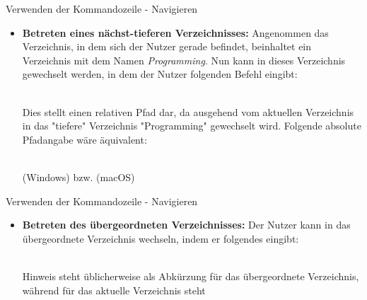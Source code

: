      
     \begin{frame}{Verwenden der Kommandozeile - Navigieren}
        
        \begin{itemize}
            \item \textbf{Betreten eines nächst-tieferen Verzeichnisses:} Angenommen das Verzeichnis, in dem sich der Nutzer gerade befindet, beinhaltet ein Verzeichnis mit dem Namen \textit{Programming}. Nun kann in dieses Verzeichnis gewechselt werden, in dem der Nutzer folgenden Befehl eingibt: \\~\
            
            
            Dies stellt einen relativen Pfad dar, da ausgehend vom aktuellen Verzeichnis in das "tiefere" Verzeichnis "Programming" gewechselt wird. Folgende absolute Pfadangabe wäre äquivalent: \\~\
            
             (Windows) bzw.  (macOS)
            
        \end{itemize}
        
     
     \end{frame}
     
      \begin{frame}{Verwenden der Kommandozeile - Navigieren}
        
        \begin{itemize}
         
            \item \textbf{Betreten des übergeordneten Verzeichnisses:} Der Nutzer kann in das übergeordnete Verzeichnis wechseln, indem er folgendes eingibt: \\~\
            
            
            \begin{block}{Hinweis}
                 steht üblicherweise als Abkürzung für das übergeordnete Verzeichnis, während  für das aktuelle Verzeichnis steht
            \end{block}
        \end{itemize}
    
     \end{frame}
     
